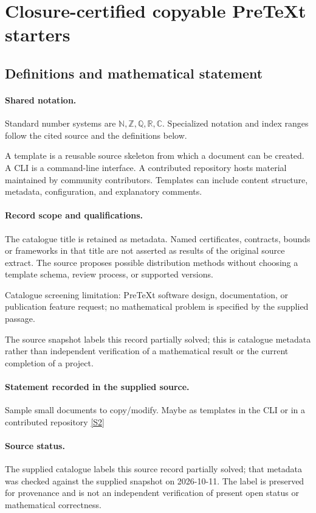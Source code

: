\documentclass[11pt]{article}
\newcommand{\sref}[2]{\hyperlink{source:#1:#2}{[S#2]}}
\begin{document}
\section{Closure-certified copyable PreTeXt starters}\label{statement}

\subsection{Definitions and mathematical statement}

\paragraph{Shared notation.}Standard number systems are $\mathbb N,\mathbb Z,\mathbb Q,\mathbb R,\mathbb C$. Specialized notation and index ranges follow the cited source and the definitions below.


A template is a reusable source skeleton from which a document can be created. A CLI is a command-line interface. A contributed repository hosts material maintained by community contributors. Templates can include content structure, metadata, configuration, and explanatory comments.
\paragraph{Record scope and qualifications.}
The catalogue title is retained as metadata. Named certificates, contracts, bounds or frameworks in that title are not asserted as results of the original source extract.
The source proposes possible distribution methods without choosing a template schema, review process, or supported versions.

Catalogue screening limitation: PreTeXt software design, documentation, or publication feature request; no mathematical problem is specified by the supplied passage.

The source snapshot labels this record partially solved; this is catalogue metadata rather than independent verification of a mathematical result or the current completion of a project.
\paragraph{Statement recorded in the supplied source.}
Sample small documents to copy/modify. Maybe as templates in the CLI or in a contributed repository \sref{statement}{2}
\paragraph{Source status.}
The supplied catalogue labels this source record partially solved; that metadata was checked against the supplied snapshot on 2026-10-11. The label is preserved for provenance and is not an independent verification of present open status or mathematical correctness.
\end{document}
